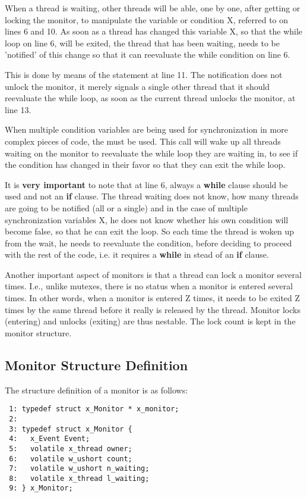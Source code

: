 When a thread is waiting, other threads will be able, one by one, after
getting or locking the monitor, to manipulate the variable or condition X,
referred to on lines 6 and 10. As soon as a thread has changed this variable
X, so that the while loop on line 6, will be exited, the thread that has
been waiting, needs to be 'notified' of this change so that it can
reevaluate the while condition on line 6. 

This is done by means of the  statement at line
11. The notification does not unlock the monitor, it merely signals a single
other thread that it should reevaluate the while loop, as soon as the
current thread unlocks the monitor, at line 13.

When multiple condition variables are being used for synchronization in more
complex pieces of code, the  must be used.
This call will wake up all threads waiting on the monitor to reevaluate the
while loop they are waiting in, to see if the condition has changed in their
favor so that they can exit the while loop.

It is \textbf{very important} to note that at line 6, always a
\textbf{while} clause should be used and not an \textbf{if} clause. The
thread waiting does not know, how many threads are going to be notified (all
or a single) and in the case of multiple synchronization variables X, he
does not know whether his own condition will become false, so that he can
exit the loop. So each time the thread is woken up from the wait, he needs
to reevaluate the condition, before deciding to proceed with the rest of the
code, i.e. it requires a \textbf{while} in stead of an \textbf{if} clause.

Another important aspect of monitors is that a thread can lock a monitor
several times. I.e., unlike mutexes, there is no  status
when a monitor is entered several times. In other words, when a monitor is
entered Z times, it needs to be exited Z times by the same thread before it
really is released by the thread. Monitor locks (entering) and unlocks
(exiting) are thus nestable. The lock count is kept in the monitor
structure.

\subsection{Monitor Structure Definition}

The structure definition of a monitor is as follows:

\bcode
\begin{verbatim}
 1: typedef struct x_Monitor * x_monitor;
 2:
 3: typedef struct x_Monitor {
 4:   x_Event Event;
 5:   volatile x_thread owner;
 6:   volatile w_ushort count;
 7:   volatile w_ushort n_waiting;
 8:   volatile x_thread l_waiting;
 9: } x_Monitor;
\end{verbatim}
\ecode

